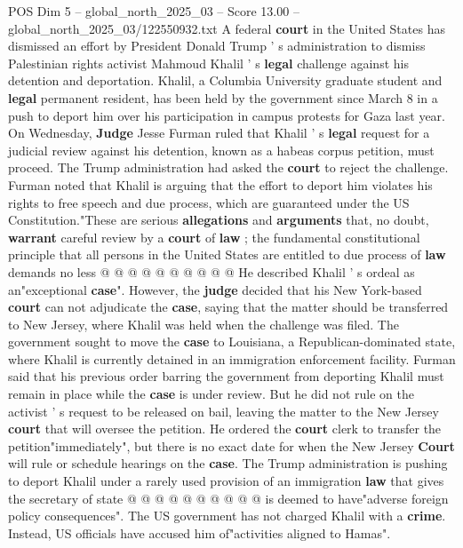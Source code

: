 \begin{textsample}{POS Dim 5 – global\_north\_2025\_03 – Score 13.00 – global\_north\_2025\_03/122550932.txt}  \label{ex:f5_pos_208}
A federal \textbf{court} in the United States has dismissed an effort by President Donald Trump ' s administration to dismiss Palestinian rights activist Mahmoud Khalil ' s \textbf{legal} challenge against his detention and deportation.
Khalil, a Columbia University graduate student and \textbf{legal} permanent resident, has been held by the government since March 8 in a push to deport him over his participation in campus protests for Gaza last year.
On Wednesday, \textbf{Judge} Jesse Furman ruled that Khalil ' s \textbf{legal} request for a judicial review against his detention, known as a habeas corpus petition, must proceed.
The Trump administration had asked the \textbf{court} to reject the challenge.
Furman noted that Khalil is arguing that the effort to deport him violates his rights to free speech and due process, which are guaranteed under the US Constitution."These are serious \textbf{allegations} and \textbf{arguments} that, no doubt, \textbf{warrant} careful review by a \textbf{court} of \textbf{law} ; the fundamental constitutional principle that all persons in the United States are entitled to due process of \textbf{law} demands no less @ @ @ @ @ @ @ @ @ @ He described Khalil ' s ordeal as an"exceptional \textbf{case}".
However, the \textbf{judge} decided that his New York-based \textbf{court} can not adjudicate the \textbf{case}, saying that the matter should be transferred to New Jersey, where Khalil was held when the challenge was filed.
The government sought to move the \textbf{case} to Louisiana, a Republican-dominated state, where Khalil is currently detained in an immigration enforcement facility.
Furman said that his previous order barring the government from deporting Khalil must remain in place while the \textbf{case} is under review.
But he did not rule on the activist ' s request to be released on bail, leaving the matter to the New Jersey \textbf{court} that will oversee the petition.
He ordered the \textbf{court} clerk to transfer the petition"immediately", but there is no exact date for when the New Jersey \textbf{Court} will rule or schedule hearings on the \textbf{case}.
The Trump administration is pushing to deport Khalil under a rarely used provision of an immigration \textbf{law} that gives the secretary of state @ @ @ @ @ @ @ @ @ @ is deemed to have"adverse foreign policy consequences".
The US government has not charged Khalil with a \textbf{crime}.
Instead, US officials have accused him of"activities aligned to Hamas".

\end{textsample}
